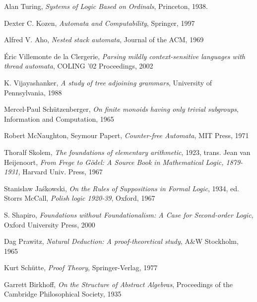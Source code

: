 \documentclass{article}
\begin{document}
\begin{thebibliography}{99}

    Alan Turing,
    \emph{Systems of Logic Based on Ordinals},
    Princeton,
    1938.

    Dexter C. Kozen,
    \emph{Automata and Computability},
    Springer,
    1997

    Alfred V. Aho,
    \emph{Nested stack automata},
    Journal of the ACM,
    1969

    \'Eric Villemonte de la Clergerie,
    \emph{Parsing mildly context-sensitive languages with thread automata},
    COLING '02 Proceedings,
    2002

    K. Vijayashanker,
    \emph{A study of tree adjoining grammars},
    University of Pennsylvania,
    1988

    Mercel-Paul Sch\"utzenberger,
    \emph{On finite monoids having only trivial subgroups},
    Information and Computation,
    1965

    Robert McNaughton, Seymour Papert,
    \emph{Counter-free Automata},
    MIT Press,
    1971

    Thoralf Skolem,
    \emph{The foundations of elementary arithmetic},
    1923,
    trans. Jean van Heijenoort,
    \emph{From Frege to G\"odel: A Source Book in Mathematical Logic, 1879-1931},
    Harvard Univ. Press,
    1967

    Stanislaw Ja\'skowski,
    \emph{On the Rules of Suppositions in Formal Logic},
    1934,
    ed. Storrs McCall,
    \emph{Polish logic 1920-39},
    Oxford,
    1967

    S. Shapiro,
    \emph{Foundations without Foundationalism: A Case for Second-order
    Logic},
    Oxford University Press,
    2000

    Dag Prawitz,
    \emph{Natural Deduction: A proof-theoretical study},
    A\&W Stockholm,
    1965

    Kurt Sch\"utte,
    \emph{Proof Theory},
    Springer-Verlag,
    1977

    Garrett Birkhoff,
    \emph{On the Structure of Abstract Algebras},
    Proceedings of the Cambridge Philosophical Society,
    1935


\end{thebibliography}
\end{document}
